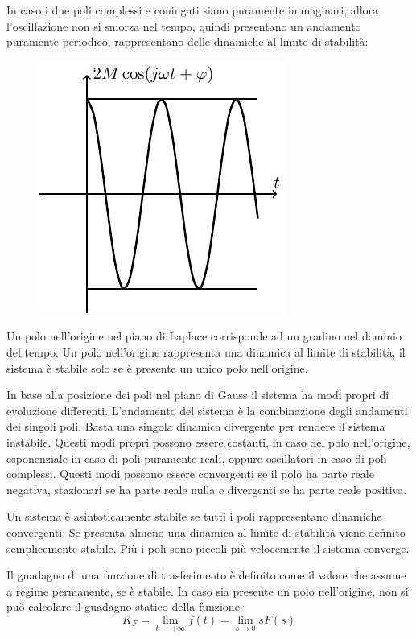 \documentclass{article}
\numberwithin{equation}{subsection}
\begin{document}
In caso i due poli complessi e coniugati siano puramente immaginari, allora l'oscillazione non si smorza nel tempo, quindi presentano un andamento puramente periodico, 
rappresentano delle dinamiche al limite di stabilità:
\begin{figure}[H]%
    \centering
    \includegraphics{oscillatorio.pdf}%
\end{figure}

Un polo nell'origine nel piano di Laplace corrisponde ad un gradino nel dominio del tempo. Un polo nell'origine rappresenta una dinamica al limite di stabilità, il 
sistema è stabile solo se è presente un unico polo nell'origine. 

In base alla posizione dei poli nel piano di Gauss il sistema ha modi propri di evoluzione differenti. L'andamento del sistema è la combinazione degli andamenti dei 
singoli poli. Basta una singola dinamica divergente per rendere il sistema instabile. Questi modi propri possono essere costanti, in caso del polo nell'origine, esponenziale 
in caso di poli puramente reali, oppure oscillatori in caso di poli complessi. Questi modi possono essere convergenti se il polo ha parte reale negativa, stazionari se ha parte 
reale nulla e divergenti se ha parte reale positiva. 

Un sistema è asintoticamente stabile se tutti i poli rappresentano dinamiche convergenti. Se presenta almeno una dinamica al limite di stabilità viene definito semplicemente 
stabile. Più i poli sono piccoli più velocemente il sistema converge. 

Il guadagno di una funzione di trasferimento è definito come il valore che assume a regime permanente, se è stabile. In caso sia presente un polo nell'origine, non si può 
calcolare il guadagno statico della funzione.
\begin{equation}
    K_F=\lim_{t\to+\infty}f(t)=\lim_{s\to0}sF(s)
\end{equation}
\end{document}
